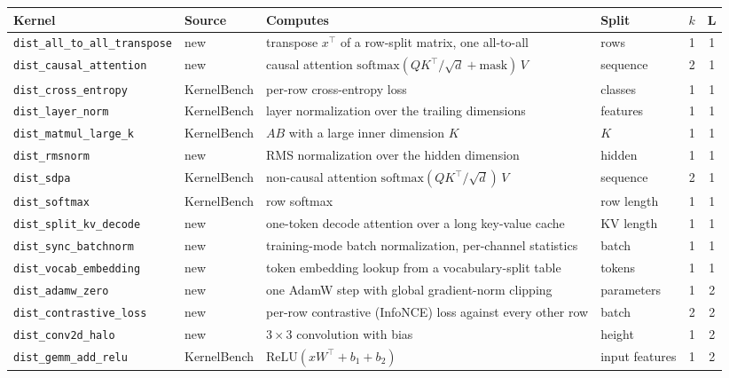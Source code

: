 \begin{widetable}[!ht]
\begin{center}
\scriptsize
\setlength{\tabcolsep}{3pt}
\begin{tabular}{@{}ll>{\raggedright\arraybackslash}p{5.0cm}lcc@{}}
\toprule
\textbf{Kernel} & \textbf{Source} & \textbf{Computes} & \textbf{Split} & \textbf{$k$} & \textbf{L} \\
\midrule
\texttt{dist\_all\_to\_all\_transpose} & new & transpose $x^\top$ of a row-split matrix, one all-to-all & rows & 1 & 1 \\
\texttt{dist\_causal\_attention} & new & causal attention $\mathrm{softmax}(QK^\top/\sqrt{d}+\text{mask})\,V$ & sequence & 2 & 1 \\
\texttt{dist\_cross\_entropy} & KernelBench & per-row cross-entropy loss & classes & 1 & 1 \\
\texttt{dist\_layer\_norm} & KernelBench & layer normalization over the trailing dimensions & features & 1 & 1 \\
\texttt{dist\_matmul\_large\_k} & KernelBench & $AB$ with a large inner dimension $K$ & $K$ & 1 & 1 \\
\texttt{dist\_rmsnorm} & new & RMS normalization over the hidden dimension & hidden & 1 & 1 \\
\texttt{dist\_sdpa} & KernelBench & non-causal attention $\mathrm{softmax}(QK^\top/\sqrt{d})\,V$ & sequence & 2 & 1 \\
\texttt{dist\_softmax} & KernelBench & row softmax & row length & 1 & 1 \\
\texttt{dist\_split\_kv\_decode} & new & one-token decode attention over a long key-value cache & KV length & 1 & 1 \\
\texttt{dist\_sync\_batchnorm} & new & training-mode batch normalization, per-channel statistics & batch & 1 & 1 \\
\texttt{dist\_vocab\_embedding} & new & token embedding lookup from a vocabulary-split table & tokens & 1 & 1 \\
\texttt{dist\_adamw\_zero} & new & one AdamW step with global gradient-norm clipping & parameters & 1 & 2 \\
\texttt{dist\_contrastive\_loss} & new & per-row contrastive (InfoNCE) loss against every other row & batch & 2 & 2 \\
\texttt{dist\_conv2d\_halo} & new & $3\times3$ convolution with bias & height & 1 & 2 \\
\texttt{dist\_gemm\_add\_relu} & KernelBench & $\mathrm{ReLU}(xW^\top+b_1+b_2)$ & input features & 1 & 2 \\

\end{tabular}
\end{center}
\end{widetable}
